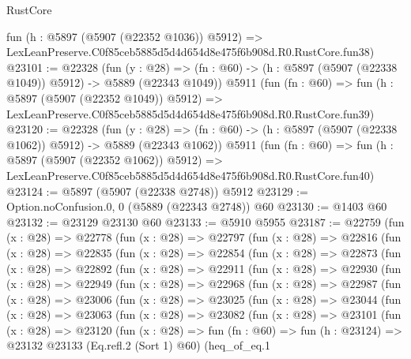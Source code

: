 \begin{lexlean}{RustCore}
\begin{coremodule}
    fun (h : @5897 (@5907 (@22352 @1036)) @5912) =>
    LexLeanPreserve.C0f85ceb5885d5d4d654d8e475f6b908d.R0.RustCore.fun38)
@23101 := @22328
    (fun (y : @28) =>
    (fn : @60) -> (h : @5897 (@5907 (@22338 @1049)) @5912) -> @5889 (@22343 @1049))
    @5911
    (fun (fn : @60) =>
    fun (h : @5897 (@5907 (@22352 @1049)) @5912) =>
    LexLeanPreserve.C0f85ceb5885d5d4d654d8e475f6b908d.R0.RustCore.fun39)
@23120 := @22328
    (fun (y : @28) =>
    (fn : @60) -> (h : @5897 (@5907 (@22338 @1062)) @5912) -> @5889 (@22343 @1062))
    @5911
    (fun (fn : @60) =>
    fun (h : @5897 (@5907 (@22352 @1062)) @5912) =>
    LexLeanPreserve.C0f85ceb5885d5d4d654d8e475f6b908d.R0.RustCore.fun40)
@23124 := @5897 (@5907 (@22338 @2748)) @5912
@23129 := Option.noConfusion.{0, 0} (@5889 (@22343 @2748)) @60
@23130 := @1403 @60
@23132 := @23129 @23130 @60
@23133 := @5910 @5955
@23187 := @22759
    (fun (x : @28) =>
    @22778
      (fun (x : @28) =>
      @22797
        (fun (x : @28) =>
        @22816
          (fun (x : @28) =>
          @22835
            (fun (x : @28) =>
            @22854
              (fun (x : @28) =>
              @22873
                (fun (x : @28) =>
                @22892
                  (fun (x : @28) =>
                  @22911
                    (fun (x : @28) =>
                    @22930
                      (fun (x : @28) =>
                      @22949
                        (fun (x : @28) =>
                        @22968
                          (fun (x : @28) =>
                          @22987
                            (fun (x : @28) =>
                            @23006
                              (fun (x : @28) =>
                              @23025
                                (fun (x : @28) =>
                                @23044
                                  (fun (x : @28) =>
                                  @23063
                                    (fun (x : @28) =>
                                    @23082
                                      (fun (x : @28) =>
                                      @23101
                                        (fun (x : @28) =>
                                        @23120
                                          (fun (x : @28) =>
                                          fun (fn : @60) =>
                                          fun (h : @23124) =>
                                          @23132
                                            @23133
                                            (Eq.refl.{2} (Sort 1) @60)
                                            (heq_of_eq.{1}

\end{coremodule}
\end{lexlean}
